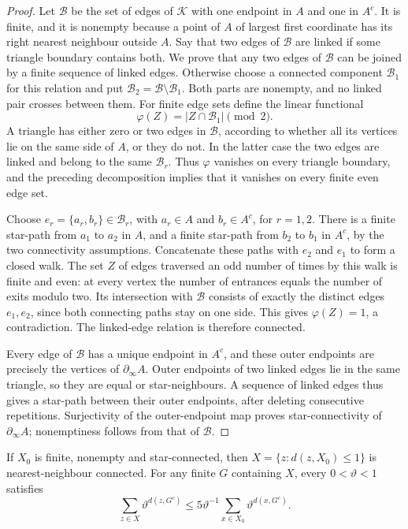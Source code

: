 \begin{proof}
Let \(\mathcal B\) be the set of edges of \(\mathcal K\)
with one endpoint in \(A\) and one in \(A^c\).  It is finite,
and it is nonempty because a point of \(A\) of largest first
coordinate has its right nearest neighbour outside \(A\).
Say that two edges of \(\mathcal B\) are linked if some
triangle boundary contains both.  We prove that any two
edges of \(\mathcal B\) can be joined by a finite sequence
of linked edges.  Otherwise choose a connected component
\(\mathcal B_1\) for this relation and put
\(\mathcal B_2=\mathcal B\setminus\mathcal B_1\).
Both parts are nonempty, and no linked pair crosses between
them.  For finite edge sets define the linear functional
\[
              \varphi(Z)=|Z\cap\mathcal B_1|\pmod2.
\]
A triangle has either zero or two edges in \(\mathcal B\),
according to whether all its vertices lie on the same side
of \(A\), or they do not.  In the latter case the two edges
are linked and belong to the same \(\mathcal B_r\).
Thus \(\varphi\) vanishes on every triangle boundary, and
the preceding decomposition implies that it vanishes on
every finite even edge set.

Choose \(e_r=\{a_r,b_r\}\in\mathcal B_r\), with
\(a_r\in A\) and \(b_r\in A^c\), for \(r=1,2\).
There is a finite star-path from \(a_1\) to \(a_2\) in
\(A\), and a finite star-path from \(b_2\) to \(b_1\)
in \(A^c\), by the two connectivity assumptions.
Concatenate these paths with \(e_2\) and \(e_1\) to form
a closed walk.  The set \(Z\) of edges traversed an odd
number of times by this walk is finite and even: at every
vertex the number of entrances equals the number of exits
modulo two.  Its intersection with \(\mathcal B\) consists
of exactly the distinct edges \(e_1,e_2\), since both
connecting paths stay on one side.  This gives
\(\varphi(Z)=1\), a contradiction.  The linked-edge relation
is therefore connected.

Every edge of \(\mathcal B\) has a unique endpoint in
\(A^c\), and these outer endpoints are precisely the
vertices of \(\partial_\infty A\).  Outer endpoints of
two linked edges lie in the same triangle, so they are
equal or star-neighbours.  A sequence of linked edges
thus gives a star-path between their outer endpoints,
after deleting consecutive repetitions.  Surjectivity of
the outer-endpoint map proves star-connectivity of
\(\partial_\infty A\); nonemptiness follows from that of
\(\mathcal B\).
\end{proof}

\begin{lemma}\label{l:thicken}
If \(X_0\) is finite, nonempty and star-connected, then
\(X=\{z:d(z,X_0)\le1\}\) is nearest-neighbour connected.
For any finite \(G\) containing \(X\), every \(0<\vartheta<1\)
satisfies
\[
 \sum_{z\in X}\vartheta^{d(z,G^c)}
       \le5\vartheta^{-1}
                      \sum_{x\in X_0}\vartheta^{d(x,G^c)}.
\]
\end{lemma}

